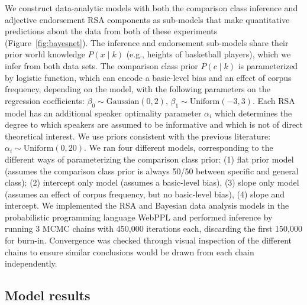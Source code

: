 \documentclass[doc]{apa6}
\begin{document}
We construct data-analytic models with both the comparison class inference and adjective endorsement RSA components as sub-models that make quantitative predictions about the data from both of these experiments (Figure~\ref{fig:bayesnet}).
The inference and endorsement sub-models share their prior world knowledge $P(x \mid k)$ (e.g., heights of basketball players), which we infer from both data sets.
The comparison class prior $P(c \mid k)$ is parameterized by logistic function, which can encode a basic-level bias and an effect of corpus frequency, depending on the model, with the following parameters on the regression coefficients:  $\beta_0 \sim \text{Gaussian}(0, 2)$, $\beta_1 \sim \text{Uniform}(-3, 3)$. 
Each RSA model has an additional speaker optimality parameter $\alpha_{i}$ which determines the degree to which speakers are assumed to be informative and which is not of direct theoretical interest.
We use priors consistent with the previous literature: $\alpha_i \sim \text{Uniform}(0, 20)$.
We ran four different models, corresponding to the different ways of parameterizing the comparison class prior: (1) flat prior model (assumes the comparison class prior is always 50/50 between specific and general class); (2) intercept only model (assumes a basic-level bias), (3) slope only model (assumes an effect of corpus frequency, but no basic-level bias), (4) slope and intercept.
We implemented the RSA and Bayesian data analysis models in the probabilistic programming language WebPPL \cite{dippl} and performed inference by running 3 MCMC chains with 450,000 iterations each, discarding the first 150,000 for burn-in. 
Convergence was checked through visual inspection of the different chains to ensure similar conclusions would be drawn from each chain independently. 




\subsection{Model results}
\end{document}

